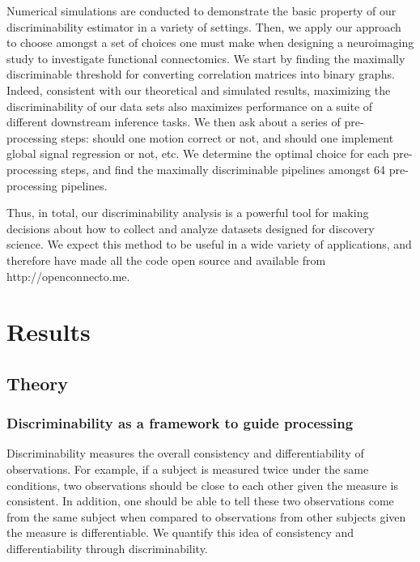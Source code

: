 \documentclass{article}
\begin{document}
 Numerical simulations are conducted to demonstrate the basic property of our discriminability estimator in a variety of settings. Then, we apply our approach to choose amongst a set of choices one must make when designing a neuroimaging study to investigate functional connectomics. We start by finding the maximally discriminable threshold for converting correlation matrices into binary graphs. Indeed, consistent with our theoretical and simulated results, maximizing the discriminability of our data sets also maximizes performance on a suite of different downstream inference tasks. We then ask about a series of pre-processing steps: should one motion correct or not, and should one implement global signal regression or not, etc. We determine the optimal choice for each pre-processing steps, and find the maximally discriminable pipelines amongst 64 pre-processing pipelines.

Thus, in total, our discriminability analysis is a powerful tool for making decisions about how to collect and analyze datasets designed for discovery science. We expect this method to be useful in a wide variety of applications,
and therefore have made all the code open source and available from http://openconnecto.me.




\section{Results}
\subsection{Theory}

\subsubsection{Discriminability as a framework to guide processing}
Discriminability measures the overall consistency and differentiability of observations. For example, if a subject is measured twice under the same conditions, two observations should be close to each other given the measure is consistent. In addition, one should be able to tell these two observations come from the same subject when compared to observations from other subjects given the measure is differentiable. We quantify this idea of consistency and differentiability through discriminability. 
\end{document}
